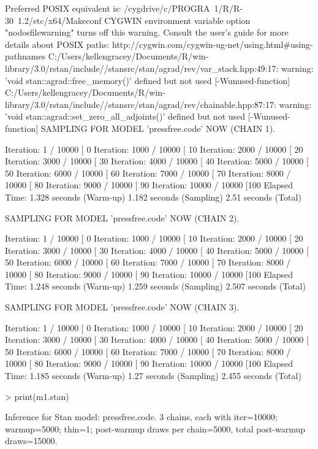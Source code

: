 \documentclass[12pt]{article}
\begin{document}
\begin{enumerate}
\begin{Schunk}
\begin{Soutput}
  Preferred POSIX equivalent is: /cygdrive/c/PROGRA~1/R/R-30~1.2/etc/x64/Makeconf
  CYGWIN environment variable option "nodosfilewarning" turns off this warning.
  Consult the user's guide for more details about POSIX paths:
    http://cygwin.com/cygwin-ug-net/using.html#using-pathnames
C:/Users/kellengracey/Documents/R/win-library/3.0/rstan/include//stansrc/stan/agrad/rev/var_stack.hpp:49:17: warning: 'void stan::agrad::free_memory()' defined but not used [-Wunused-function]
C:/Users/kellengracey/Documents/R/win-library/3.0/rstan/include//stansrc/stan/agrad/rev/chainable.hpp:87:17: warning: 'void stan::agrad::set_zero_all_adjoints()' defined but not used [-Wunused-function]
SAMPLING FOR MODEL 'pressfree.code' NOW (CHAIN 1).

Iteration:    1 / 10000 [  0%
Iteration: 1000 / 10000 [ 10%
Iteration: 2000 / 10000 [ 20%
Iteration: 3000 / 10000 [ 30%
Iteration: 4000 / 10000 [ 40%
Iteration: 5000 / 10000 [ 50%
Iteration: 6000 / 10000 [ 60%
Iteration: 7000 / 10000 [ 70%
Iteration: 8000 / 10000 [ 80%
Iteration: 9000 / 10000 [ 90%
Iteration: 10000 / 10000 [100%
Elapsed Time: 1.328 seconds (Warm-up)
              1.182 seconds (Sampling)
              2.51 seconds (Total)

SAMPLING FOR MODEL 'pressfree.code' NOW (CHAIN 2).

Iteration:    1 / 10000 [  0%
Iteration: 1000 / 10000 [ 10%
Iteration: 2000 / 10000 [ 20%
Iteration: 3000 / 10000 [ 30%
Iteration: 4000 / 10000 [ 40%
Iteration: 5000 / 10000 [ 50%
Iteration: 6000 / 10000 [ 60%
Iteration: 7000 / 10000 [ 70%
Iteration: 8000 / 10000 [ 80%
Iteration: 9000 / 10000 [ 90%
Iteration: 10000 / 10000 [100%
Elapsed Time: 1.248 seconds (Warm-up)
              1.259 seconds (Sampling)
              2.507 seconds (Total)

SAMPLING FOR MODEL 'pressfree.code' NOW (CHAIN 3).

Iteration:    1 / 10000 [  0%
Iteration: 1000 / 10000 [ 10%
Iteration: 2000 / 10000 [ 20%
Iteration: 3000 / 10000 [ 30%
Iteration: 4000 / 10000 [ 40%
Iteration: 5000 / 10000 [ 50%
Iteration: 6000 / 10000 [ 60%
Iteration: 7000 / 10000 [ 70%
Iteration: 8000 / 10000 [ 80%
Iteration: 9000 / 10000 [ 90%
Iteration: 10000 / 10000 [100%
Elapsed Time: 1.185 seconds (Warm-up)
              1.27 seconds (Sampling)
              2.455 seconds (Total)
\end{Soutput}
\begin{Sinput}
> print(m1.stan)
\end{Sinput}
\begin{Soutput}
Inference for Stan model: pressfree.code.
3 chains, each with iter=10000; warmup=5000; thin=1; 
post-warmup draws per chain=5000, total post-warmup draws=15000.


\end{Soutput}
\end{Schunk}
\end{enumerate}
\end{document}
